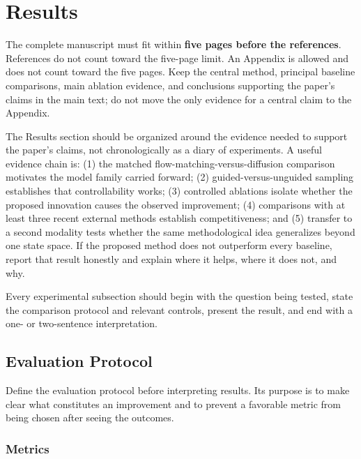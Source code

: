 \documentclass{article}
\begin{document}
\section{Results}

The complete manuscript must fit within \textbf{five pages before the references}. References do not count toward the five-page limit. An Appendix is allowed and does not count toward the five pages. Keep the central method, principal baseline comparisons, main ablation evidence, and conclusions supporting the paper's claims in the main text; do not move the only evidence for a central claim to the Appendix.

The Results section should be organized around the evidence needed to support the paper's claims, not chronologically as a diary of experiments. A useful evidence chain is: (1) the matched flow-matching-versus-diffusion comparison motivates the model family carried forward; (2) guided-versus-unguided sampling establishes that controllability works; (3) controlled ablations isolate whether the proposed innovation causes the observed improvement; (4) comparisons with at least three recent external methods establish competitiveness; and (5) transfer to a second modality tests whether the same methodological idea generalizes beyond one state space. If the proposed method does not outperform every baseline, report that result honestly and explain where it helps, where it does not, and why.

Every experimental subsection should begin with the question being tested, state the comparison protocol and relevant controls, present the result, and end with a one- or two-sentence interpretation.

\subsection{Evaluation Protocol}

Define the evaluation protocol before interpreting results. Its purpose is to make clear what constitutes an improvement and to prevent a favorable metric from being chosen after seeing the outcomes.

\subsubsection{Metrics}
\end{document}
